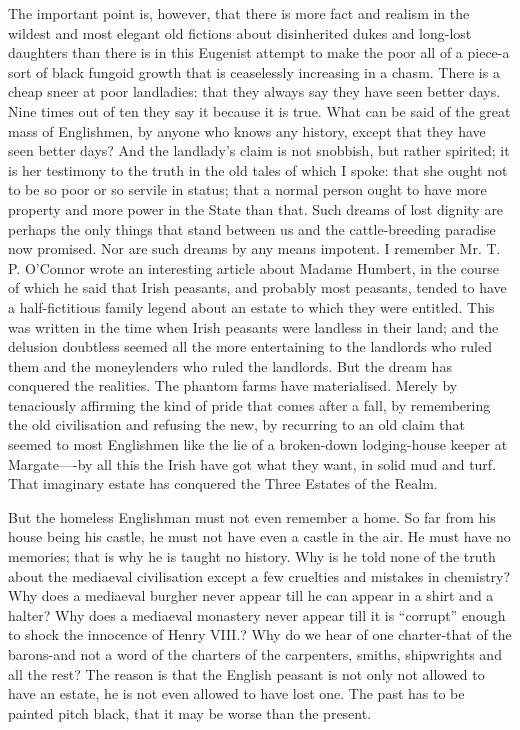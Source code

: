 \documentclass{book}
\begin{document}
The important point is, however, that there is more fact and realism in the wildest and most elegant old fictions about disinherited dukes and long-lost daughters than there is in this Eugenist attempt to make the poor all of a piece-a sort of black fungoid growth that is ceaselessly increasing in a chasm. There is a cheap sneer at poor landladies: that they always say they have seen better days. Nine times out of ten they say it because it is true. What can be said of the great mass of Englishmen, by anyone who knows any history, except that they have seen better days? And the landlady’s claim is not snobbish, but rather spirited; it is her testimony to the truth in the old tales of which I spoke: that she ought not to be so poor or so servile in status; that a normal person ought to have more property and more power in the State than that. Such dreams of lost dignity are perhaps the only things that stand between us and the cattle-breeding paradise now promised. Nor are such dreams by any means impotent. I remember Mr. T. P. O’Connor wrote an interesting article about Madame Humbert, in the course of which he said that Irish peasants, and probably most peasants, tended to have a half-fictitious family legend about an estate to which they were entitled. This was written in the time when Irish peasants were landless in their land; and the delusion doubtless seemed all the more entertaining to the landlords who ruled them and the moneylenders who ruled the landlords. But the dream has conquered the realities. The phantom farms have materialised. Merely by tenaciously affirming the kind of pride that comes after a fall, by remembering the old civilisation and refusing the new, by recurring to an old claim that seemed to most Englishmen like the lie of a broken-down lodging-house keeper at Margate—-by all this the Irish have got what they want, in solid mud and turf. That imaginary estate has conquered the Three Estates of the Realm.

But the homeless Englishman must not even remember a home. So far from his house being his castle, he must not have even a castle in the air. He must have no memories; that is why he is taught no history. Why is he told none of the truth about the mediaeval civilisation except a few cruelties and mistakes in chemistry? Why does a mediaeval burgher never appear till he can appear in a shirt and a halter? Why does a mediaeval monastery never appear till it is “corrupt” enough to shock the innocence of Henry VIII.? Why do we hear of one charter-that of the barons-and not a word of the charters of the carpenters, smiths, shipwrights and all the rest? The reason is that the English peasant is not only not allowed to have an estate, he is not even allowed to have lost one. The past has to be painted pitch black, that it may be worse than the present.
\end{document}
